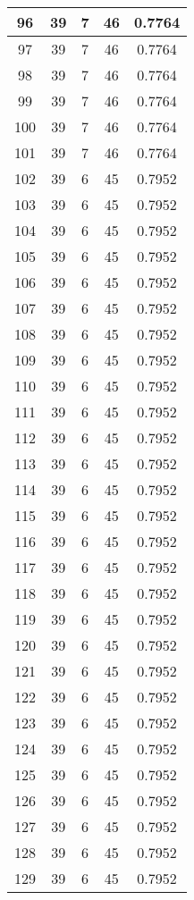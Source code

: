 \documentclass[letterpaper, 12pt]{article}
\begin{document}
\begin{longtable}{|c|c|c|c|c|}
\hline
96 & 39 & 7 & 46 & 0.7764 \\
\hline
97 & 39 & 7 & 46 & 0.7764 \\
\hline
98 & 39 & 7 & 46 & 0.7764 \\
\hline
99 & 39 & 7 & 46 & 0.7764 \\
\hline
100 & 39 & 7 & 46 & 0.7764 \\
\hline
101 & 39 & 7 & 46 & 0.7764 \\
\hline
102 & 39 & 6 & 45 & 0.7952 \\
\hline
103 & 39 & 6 & 45 & 0.7952 \\
\hline
104 & 39 & 6 & 45 & 0.7952 \\
\hline
105 & 39 & 6 & 45 & 0.7952 \\
\hline
106 & 39 & 6 & 45 & 0.7952 \\
\hline
107 & 39 & 6 & 45 & 0.7952 \\
\hline
108 & 39 & 6 & 45 & 0.7952 \\
\hline
109 & 39 & 6 & 45 & 0.7952 \\
\hline
110 & 39 & 6 & 45 & 0.7952 \\
\hline
111 & 39 & 6 & 45 & 0.7952 \\
\hline
112 & 39 & 6 & 45 & 0.7952 \\
\hline
113 & 39 & 6 & 45 & 0.7952 \\
\hline
114 & 39 & 6 & 45 & 0.7952 \\
\hline
115 & 39 & 6 & 45 & 0.7952 \\
\hline
116 & 39 & 6 & 45 & 0.7952 \\
\hline
117 & 39 & 6 & 45 & 0.7952 \\
\hline
118 & 39 & 6 & 45 & 0.7952 \\
\hline
119 & 39 & 6 & 45 & 0.7952 \\
\hline
120 & 39 & 6 & 45 & 0.7952 \\
\hline
121 & 39 & 6 & 45 & 0.7952 \\
\hline
122 & 39 & 6 & 45 & 0.7952 \\
\hline
123 & 39 & 6 & 45 & 0.7952 \\
\hline
124 & 39 & 6 & 45 & 0.7952 \\
\hline
125 & 39 & 6 & 45 & 0.7952 \\
\hline
126 & 39 & 6 & 45 & 0.7952 \\
\hline
127 & 39 & 6 & 45 & 0.7952 \\
\hline
128 & 39 & 6 & 45 & 0.7952 \\
\hline
129 & 39 & 6 & 45 & 0.7952 \\

\end{longtable}
\end{document}
